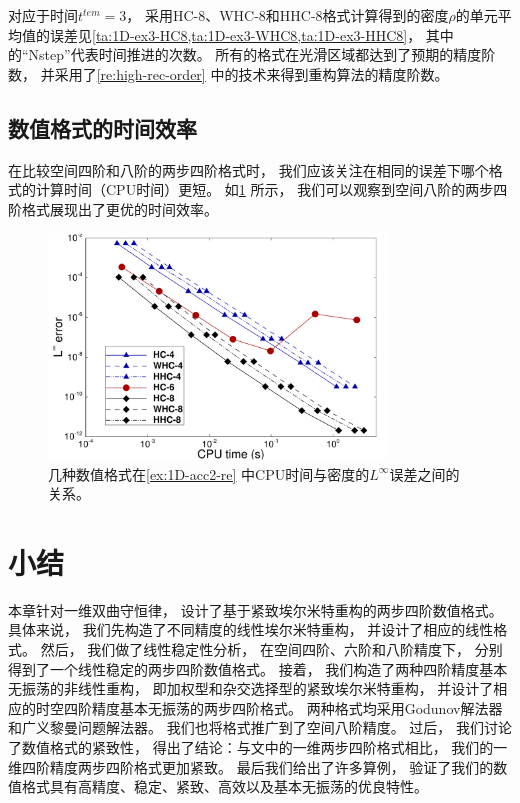 对应于时间$t^{tem}=3$，
采用HC-8、WHC-8和HHC-8格式计算得到的密度$\rho$的单元平均值的误差见\cref{ta:1D-ex3-HC8,ta:1D-ex3-WHC8,ta:1D-ex3-HHC8}，
其中的“Nstep”代表时间推进的次数。
所有的格式在光滑区域都达到了预期的精度阶数，
并采用了\cref{re:high-rec-order} 中的技术来得到重构算法的精度阶数。



\subsection{数值格式的时间效率}

在比较空间四阶和八阶的两步四阶格式时，
我们应该关注在相同的误差下哪个格式的计算时间（CPU时间）更短。
如\cref{fig:1D-time} 所示，
我们可以观察到空间八阶的两步四阶格式展现出了更优的时间效率。

\begin{figure}[htbp]
  \centering
  \includegraphics[width=0.8\textwidth]{fig/Time/Time-1D.pdf}
  \caption{几种数值格式在\cref{ex:1D-acc2-re} 中CPU时间与密度的$L^\infty$误差之间的关系。
  }
  \label{fig:1D-time}
\end{figure}

\section{小结}

本章针对一维双曲守恒律，
设计了基于紧致埃尔米特重构的两步四阶数值格式。
具体来说，
我们先构造了不同精度的线性埃尔米特重构，
并设计了相应的线性格式。
然后，
我们做了线性稳定性分析，
在空间四阶、六阶和八阶精度下，
分别得到了一个线性稳定的两步四阶数值格式。
接着，
我们构造了两种四阶精度基本无振荡的非线性重构，
即加权型和杂交选择型的紧致埃尔米特重构，
并设计了相应的时空四阶精度基本无振荡的两步四阶格式。
两种格式均采用Godunov解法器和广义黎曼问题解法器。
我们也将格式推广到了空间八阶精度。
过后，
我们讨论了数值格式的紧致性，
得出了结论：与文\cite{du2018hermite}中的一维两步四阶格式相比，
我们的一维四阶精度两步四阶格式更加紧致。
最后我们给出了许多算例，
验证了我们的数值格式具有高精度、稳定、紧致、高效以及基本无振荡的优良特性。